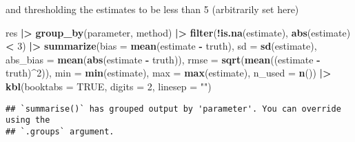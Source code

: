 \documentclass[
]{article}
\newenvironment{Shaded}{\begin{snugshade}}{\end{snugshade}}
\newcommand{\AttributeTok}[1]{\textcolor[rgb]{0.13,0.29,0.53}{#1}}
\newcommand{\ConstantTok}[1]{\textcolor[rgb]{0.56,0.35,0.01}{#1}}
\newcommand{\DecValTok}[1]{\textcolor[rgb]{0.00,0.00,0.81}{#1}}
\newcommand{\FunctionTok}[1]{\textcolor[rgb]{0.13,0.29,0.53}{\textbf{#1}}}
\newcommand{\NormalTok}[1]{#1}
\newcommand{\SpecialCharTok}[1]{\textcolor[rgb]{0.81,0.36,0.00}{\textbf{#1}}}
\newcommand{\StringTok}[1]{\textcolor[rgb]{0.31,0.60,0.02}{#1}}
\begin{document}
and thresholding the estimates to be less than 5 (arbitrarily set here)

\begin{Shaded}
\begin{Highlighting}[]
\NormalTok{res }\SpecialCharTok{|\textgreater{}} \FunctionTok{group\_by}\NormalTok{(parameter, method) }\SpecialCharTok{|\textgreater{}}
    \FunctionTok{filter}\NormalTok{(}\SpecialCharTok{!}\FunctionTok{is.na}\NormalTok{(estimate), }\FunctionTok{abs}\NormalTok{(estimate) }\SpecialCharTok{\textless{}} \DecValTok{3}\NormalTok{) }\SpecialCharTok{|\textgreater{}}
    \FunctionTok{summarize}\NormalTok{(}\AttributeTok{bias =} \FunctionTok{mean}\NormalTok{(estimate }\SpecialCharTok{{-}}\NormalTok{ truth),}
              \AttributeTok{sd =} \FunctionTok{sd}\NormalTok{(estimate),}
              \AttributeTok{abs\_bias =} \FunctionTok{mean}\NormalTok{(}\FunctionTok{abs}\NormalTok{(estimate }\SpecialCharTok{{-}}\NormalTok{ truth)),}
              \AttributeTok{rmse =} \FunctionTok{sqrt}\NormalTok{(}\FunctionTok{mean}\NormalTok{((estimate }\SpecialCharTok{{-}}\NormalTok{ truth)}\SpecialCharTok{\^{}}\DecValTok{2}\NormalTok{)),}
              \AttributeTok{min =} \FunctionTok{min}\NormalTok{(estimate),}
              \AttributeTok{max =} \FunctionTok{max}\NormalTok{(estimate),}
              \AttributeTok{n\_used =} \FunctionTok{n}\NormalTok{()) }\SpecialCharTok{|\textgreater{}}
  \FunctionTok{kbl}\NormalTok{(}\AttributeTok{booktabs =} \ConstantTok{TRUE}\NormalTok{, }\AttributeTok{digits =} \DecValTok{2}\NormalTok{, }\AttributeTok{linesep =} \StringTok{""}\NormalTok{)}
\end{Highlighting}
\end{Shaded}

\begin{verbatim}
## `summarise()` has grouped output by 'parameter'. You can override using the
## `.groups` argument.
\end{verbatim}
\end{document}
